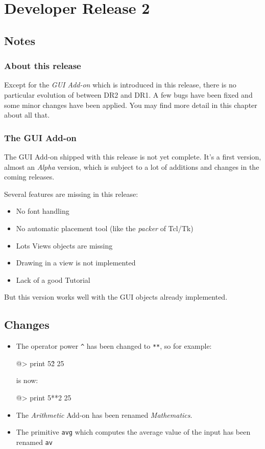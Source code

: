 \section{Developer Release 2}

\subsection{Notes}

\subsubsection{About this release}

Except for the {\em GUI Add-on} which is introduced in this release, there is no particular evolution of \squirrel between DR2 and DR1. A few bugs have been fixed and some minor changes have been applied. You may find more detail in this chapter about all that.

\subsubsection{The GUI Add-on}

The GUI Add-on shipped with this release is not yet complete. It's a first version, almost an {\em Alpha} version, which is subject to a lot of additions and changes in the coming releases.

Several features are missing in this release:

\begin{itemize}
\item No font handling
\item No automatic placement tool (like the {\em packer} of Tcl/Tk)
\item Lots Views objects are missing
\item Drawing in a view is not implemented
\item Lack of a good Tutorial
\end{itemize}

But this version works well with the GUI objects already implemented.

\subsection{Changes}
\begin{itemize}
\item The operator power \verb+^+ has been changed to \verb+**+, so for example:
\begin{verbatimtab}
@> print 5\^2
25
\end{verbatimtab}
is now:
\begin{verbatimtab}
@> print 5**2
25
\end{verbatimtab}
\item The {\em Arithmetic} Add-on has been renamed {\em Mathematics}.
\item The primitive {\tt avg} which computes the average value of the input has been renamed {\tt av}
\end{itemize}

